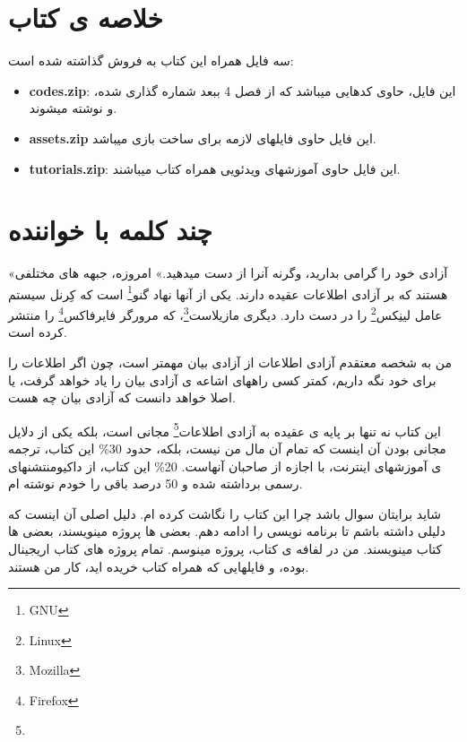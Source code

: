 \documentclass[14pt,a4paper]{memoir}
\begin{document}
	 
	 
	 \chapter*{خلاصه ی کتاب}
	 
	 
	 \begin{files}
	 	سه فایل همراه این کتاب به فروش گذاشته شده است:
	 	\begin{itemize}
	 		\item \textbf{codes.zip}: این فایل، حاوی کدهایی میباشد که از فصل 4 ببعد شماره گذاری شده، و نوشته میشوند.
	 		\item \textbf{assets.zip} این فایل حاوی فایلهای لازمه برای ساخت بازی میباشد.
	 		\item  \textbf{tutorials.zip}: این فایل حاوی آموزشهای ویدئویی همراه کتاب میباشند.
	 	\end{itemize}
	 \end{files}
	 
	 
	 \newpage
	 \tableofcontents
	 \mainmatter
	 
	 \chapter{چند کلمه با خواننده} \label{foreword}

	«آزادی خود را گرامی بدارید، وگرنه آنرا از دست میدهید.»
	امروزه، جبهه های مختلفی هستند که بر آزادی اطلاعات عقیده دارند. یکی از آنها نهاد گنو\footnote{GNU} است که کِرنل سیستم عامل لینِکس\footnote{Linux} را در دست دارد. دیگری مازیلاست\footnote{Mozilla}، که مرورگر فایرفاکس\footnote{Firefox} را منتشر کرده است. 
	
	من به شخصه معتقدم آزادی اطلاعات از آزادی بیان مهمتر است، چون اگر اطلاعات را برای خود نگه داریم، کمتر کسی راههای اشاعه ی آزادی بیان را یاد خواهد گرفت، یا اصلا خواهد دانست که آزادی بیان چه هست. 
	
	این کتاب نه تنها بر پایه ی عقیده به آزادی اطلاعات\footnote{} مجانی است، بلکه یکی از دلایل مجانی بودن آن اینست که تمام آن مال من نیست، بلکه، حدود 30\% این کتاب، ترجمه ی آموزشهای اینترنت، با اجازه از صاحبان آنهاست. 20\% این کتاب، از داکیومنتشنهای رسمی برداشته شده  و 50 درصد باقی را خودم نوشته ام.
	
	شاید برایتان سوال باشد چرا این کتاب را نگاشت کرده ام. دلیل اصلی آن اینست که دلیلی داشته باشم تا برنامه نویسی را ادامه دهم. بعضی ها پروژه مینویسند، بعضی ها کتاب مینویسند. من در لفافه ی کتاب، پروژه مینوسم. تمام پروژه های کتاب اریجینال بوده، و فایلهایی که همراه کتاب خریده اید، کار من هستند.
	
\end{document}
